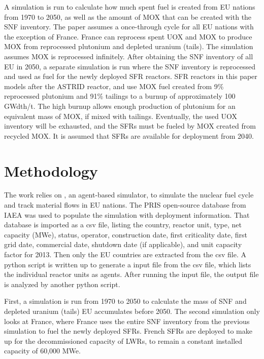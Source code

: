 A \Cyclus simulation is run to calculate
how much spent fuel is created from \gls{EU} nations from 1970 to 2050, as well as the amount
of \gls{MOX} that can be created with the \gls{SNF} inventory.
The paper assumes a once-through cycle for all 
\gls{EU} nations with the exception of France. France can reprocess spent \gls{UOX} and \gls{MOX} to
produce \gls{MOX} from reprocessed plutonium and depleted uranium (tails).
The simulation assumes \gls{MOX} is reprocessed infinitely. 
After obtaining the \gls{SNF} inventory of all \gls{EU} in 2050, a separate
simulation is run where the \gls{SNF} inventory is reprocessed and
used as fuel for the newly deployed \gls{SFR} reactors.
\gls{SFR} reactors in this paper models after the ASTRID reactor,
and use \gls{MOX} fuel created from 9\% reprocessed plutonium
and 91\% tailings to a burnup
of approximately 100 GWdth/t. The high burnup allows enough production of plutonium
for an equivalent mass of \gls{MOX}, if mixed with tailings.  Eventually,
the used \gls{UOX} inventory will be exhausted, and the \glspl{SFR} must be
fueled by \gls{MOX} created from recycled \gls{MOX}.
It is assumed that \glspl{SFR} are available for deployment
from 2040. 


\section{Methodology}
The work relies on \Cyclus, an agent-based simulator, to simulate the nuclear fuel cycle
and track material flows in \gls{EU} nations. The \gls{PRIS} open-source 
database from \gls{IAEA} was used to populate the simulation with deployment 
information. That database is imported as a csv file, listing the country, reactor unit, type, net capacity (MWe), status,
operator, construction date, first criticality date, first grid date, commercial date, shutdown
date (if applicable), and unit capacity factor for 2013. Then only the \gls{EU} countries are extracted
from the csv file. A python script is written up to generate a \Cyclus input file from the csv file,
which lists the individual reactor units as agents. After running the \Cyclus input file,
the output file is analyzed by another python script.

First, a simulation is run from 1970 to 2050 to calculate the mass of 
\gls{SNF} and depleted uranium (tails) \gls{EU} accumulates before 2050. 
The second simulation only looks at France, where France
uses the entire \gls{SNF} inventory from the previous
simulation to fuel
the newly deployed \glspl{SFR}. French \gls{SFR}s are deployed
to make up for the decommissioned capacity of \gls{LWR}s, to
remain a constant installed capacity of 60,000 MWe.


